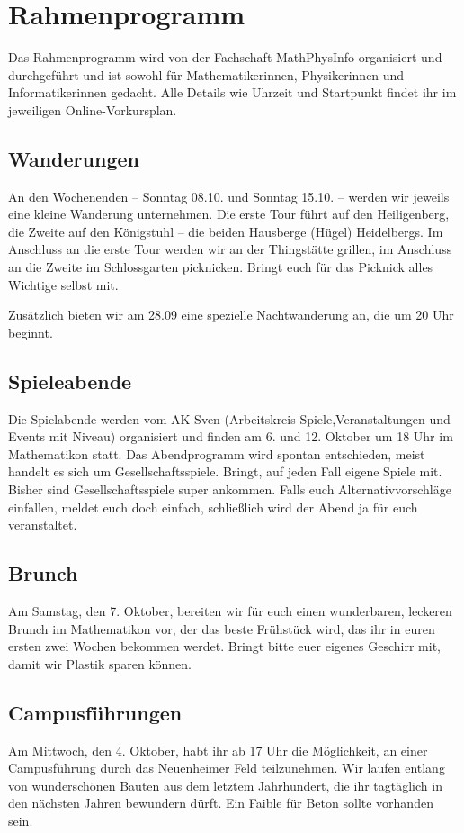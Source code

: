 \newpage
\section{Rahmenprogramm}

Das Rahmenprogramm wird von der Fachschaft MathPhysInfo organisiert und durchgeführt und ist sowohl für Mathematikerinnen, Physikerinnen und Informatikerinnen gedacht. Alle Details wie Uhrzeit und Startpunkt findet ihr im jeweiligen Online-Vorkursplan.

\subsection{Wanderungen}
An den Wochenenden -- Sonntag 08.10. und Sonntag 15.10. -- werden wir jeweils eine kleine Wanderung unternehmen. Die erste Tour führt auf den Heiligenberg, die Zweite auf den Königstuhl -- die beiden Hausberge (Hügel) Heidelbergs. Im Anschluss an die erste Tour werden wir an der Thingstätte grillen, im Anschluss an die Zweite im Schlossgarten picknicken. Bringt euch für das Picknick alles Wichtige selbst mit.

Zusätzlich bieten wir am 28.09 eine spezielle Nachtwanderung an, die um 20 Uhr beginnt.

\subsection{Spieleabende}
Die Spielabende werden vom AK Sven (Arbeitskreis Spiele,Veranstaltungen und Events mit Niveau) organisiert und finden am 6. und 12. Oktober um 18 Uhr im \gls{Mathematikon} statt. Das Abendprogramm wird spontan entschieden, meist handelt es sich um Gesellschaftsspiele. Bringt, auf jeden Fall eigene Spiele mit. Bisher sind Gesellschaftsspiele super ankommen. Falls euch Alternativvorschläge einfallen, meldet euch doch einfach, schließlich wird der Abend ja für euch veranstaltet.

\subsection{Brunch}
Am Samstag, den 7. Oktober, bereiten wir für euch einen wunderbaren, leckeren Brunch im \gls{Mathematikon} vor, der das beste Frühstück wird, das ihr in euren ersten zwei Wochen bekommen werdet. Bringt bitte euer eigenes Geschirr mit, damit wir Plastik sparen können.

\subsection{Campusführungen}
Am Mittwoch, den 4. Oktober, habt ihr ab 17 Uhr die Möglichkeit, an einer Campusführung durch das Neuenheimer Feld teilzunehmen. Wir laufen entlang von wunderschönen Bauten aus dem letztem Jahrhundert, die ihr tagtäglich in den nächsten Jahren bewundern dürft. Ein Faible für Beton sollte vorhanden sein.

